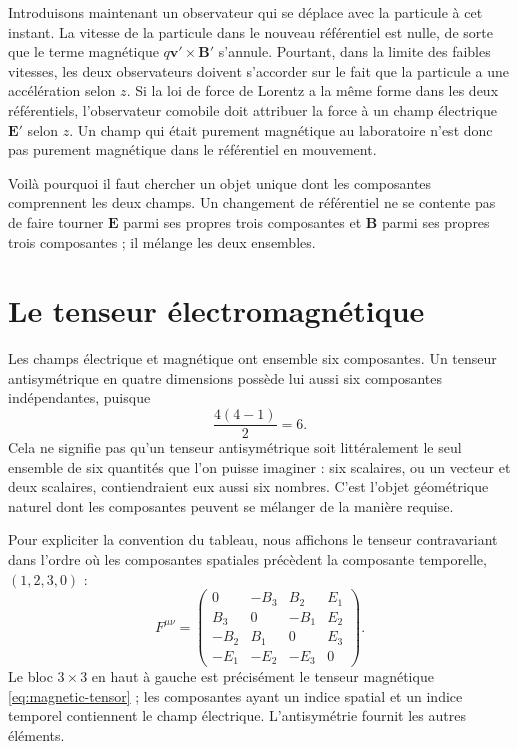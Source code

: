Introduisons maintenant un observateur qui se déplace avec la particule à cet instant. La vitesse de la particule dans le nouveau référentiel est nulle, de sorte que le terme magnétique \(q\boldsymbol v'\times\boldsymbol B'\) s’annule. Pourtant, dans la limite des faibles vitesses, les deux observateurs doivent s’accorder sur le fait que la particule a une accélération selon \(z\). Si la loi de force de Lorentz a la même forme dans les deux référentiels, l’observateur comobile doit attribuer la force à un champ électrique \(\boldsymbol E'\) selon \(z\). Un champ qui était purement magnétique au laboratoire n’est donc pas purement magnétique dans le référentiel en mouvement.

Voilà pourquoi il faut chercher un objet unique dont les composantes comprennent les deux champs. Un changement de référentiel ne se contente pas de faire tourner \(\boldsymbol E\) parmi ses propres trois composantes et \(\boldsymbol B\) parmi ses propres trois composantes ; il mélange les deux ensembles.

\section{Le tenseur électromagnétique}

Les champs électrique et magnétique ont ensemble six composantes. Un tenseur antisymétrique en quatre dimensions possède lui aussi six composantes indépendantes, puisque
\begin{equation}
  \frac{4(4-1)}{2}=6.
\end{equation}
Cela ne signifie pas qu’un tenseur antisymétrique soit littéralement le seul ensemble de six quantités que l’on puisse imaginer : six scalaires, ou un vecteur et deux scalaires, contiendraient eux aussi six nombres. C’est l’objet géométrique naturel dont les composantes peuvent se mélanger de la manière requise.

Pour expliciter la convention du tableau, nous affichons le tenseur contravariant dans l’ordre où les composantes spatiales précèdent la composante temporelle, \((1,2,3,0)\) :
\begin{equation}
  F^{\mu\nu}=
  \begin{pmatrix}
    0 & -B_3 & B_2 & E_1 \\
    B_3 & 0 & -B_1 & E_2 \\
    -B_2 & B_1 & 0 & E_3 \\
    -E_1 & -E_2 & -E_3 & 0
  \end{pmatrix}.
  \label{eq:l07-field-tensor}
\end{equation}
Le bloc \(3\times3\) en haut à gauche est précisément le tenseur magnétique \eqref{eq:magnetic-tensor} ; les composantes ayant un indice spatial et un indice temporel contiennent le champ électrique. L’antisymétrie fournit les autres éléments.

